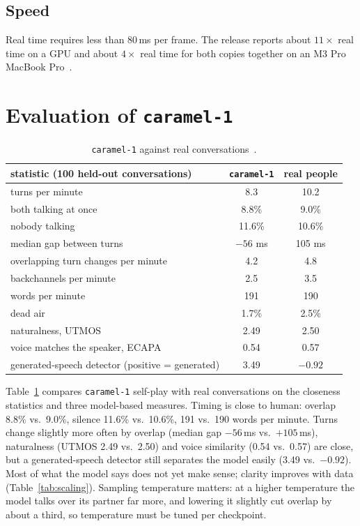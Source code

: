 \documentclass[10pt]{article}
\begin{document}
\subsection{Speed}
Real time requires less than 80\,ms per frame. The release reports about $11\times$ real time on a GPU and about $4\times$ real time for both copies together on an M3 Pro MacBook Pro~\cite{caramel1}.

\section{Evaluation of \texttt{caramel-1}}
\label{sec:eval}
\begin{table}[t]\centering\small
\begin{tabular}{lcc}\toprule
statistic (100 held-out conversations) & \texttt{caramel-1} & real people\\\midrule
turns per minute & 8.3 & 10.2\\
both talking at once & 8.8\% & 9.0\%\\
nobody talking & 11.6\% & 10.6\%\\
median gap between turns & $-56$ ms & 105 ms\\
overlapping turn changes per minute & 4.2 & 4.8\\
backchannels per minute & 2.5 & 3.5\\
words per minute & 191 & 190\\
dead air & 1.7\% & 2.5\%\\
naturalness, UTMOS~\cite{saeki2022utmos} & 2.49 & 2.50\\
voice matches the speaker, ECAPA~\cite{desplanques2020ecapa} & 0.54 & 0.57\\
generated-speech detector (positive = generated) & 3.49 & $-0.92$\\\bottomrule
\end{tabular}
\caption{\texttt{caramel-1} against real conversations~\cite{caramel1}.}
\label{tab:caramel-stats}
\end{table}
Table~\ref{tab:caramel-stats} compares \texttt{caramel-1} self-play with real conversations on the closeness statistics and three model-based measures. Timing is close to human: overlap 8.8\% vs.\ 9.0\%, silence 11.6\% vs.\ 10.6\%, 191 vs.\ 190 words per minute. Turns change slightly more often by overlap (median gap $-56$\,ms vs.\ $+105$\,ms), naturalness (UTMOS 2.49 vs.\ 2.50) and voice similarity (0.54 vs.\ 0.57) are close, but a generated-speech detector still separates the model easily (3.49 vs.\ $-0.92$). Most of what the model says does not yet make sense; clarity improves with data (Table~\ref{tab:scaling}). Sampling temperature matters: at a higher temperature the model talks over its partner far more, and lowering it slightly cut overlap by about a third, so temperature must be tuned per checkpoint.
\end{document}
